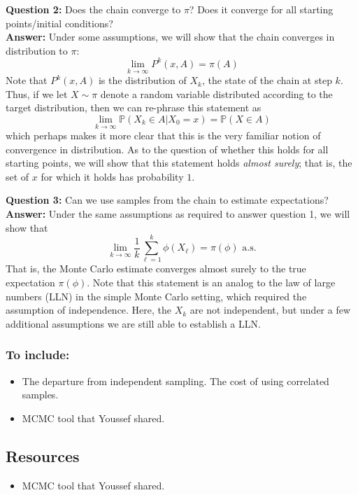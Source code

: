 \documentclass[12pt]{article}
\newcommand{\Prob}{\mathbb{P}}
\begin{document}
\bigskip
\noindent
\textbf{Question 2:} Does the chain converge to $\pi$? Does it converge for all starting points/initial conditions? \\
\textbf{Answer:} Under some assumptions, we will show that the chain converges in distribution to $\pi$: 
\[\lim_{k \to \infty} P^k(x, A) = \pi(A)\]
Note that $P^{k}(x, A)$ is the distribution of $X_k$, the state of the chain at step $k$. Thus, if we let $X \sim \pi$ denote a random variable distributed according to the target distribution, then we can re-phrase this
statement as 
\[\lim_{k \to \infty} \Prob(X_k \in A|X_0 = x) = \Prob(X \in A)\]
which perhaps makes it more clear that this is the very familiar notion of convergence in distribution. 
As to the question of whether this holds for all starting points, we will show that this statement holds \textit{almost surely}; that is, the set of $x$ for which it holds has probability $1$.

\bigskip
\noindent
\textbf{Question 3:} Can we use samples from the chain to estimate expectations? \\
\textbf{Answer:} Under the same assumptions as required to answer question 1, we will show that 
\[\lim_{k \to \infty} \frac{1}{k} \sum_{\ell = 1}^{k} \phi(X_\ell) = \pi(\phi) \text{ a.s.}\]
That is, the Monte Carlo estimate converges almost surely to the true expectation $\pi(\phi)$. Note that this statement is an analog to the law of large numbers (LLN) in the simple Monte Carlo setting, which required the 
assumption of independence. Here, the $X_k$ are not independent, but under a few additional assumptions we are still able to establish a LLN. 


\subsubsection{To include:}
\begin{itemize}
\item The departure from independent sampling. The cost of using correlated samples. 
\item MCMC tool that Youssef shared. 
\end{itemize}

\subsection{Resources}
\begin{itemize}
\item MCMC tool that Youssef shared. 
\end{itemize}
\end{document}
